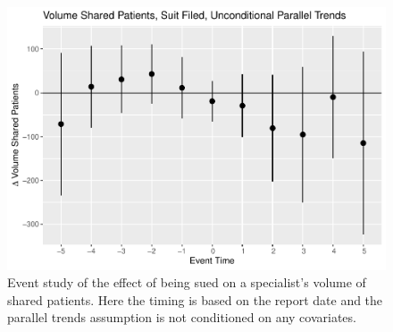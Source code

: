 \documentclass[
  12pt,
]{article}
\begin{document}
\begin{figure}
\centering
\includegraphics{Paper_files/figure-latex/volsfestud-1.pdf}
\caption{\label{fig:volsfestud}Event study of the effect of being sued on a specialist's volume of shared patients. Here the timing is based on the report date and the parallel trends assumption is not conditioned on any covariates.}
\end{figure}
\end{document}
